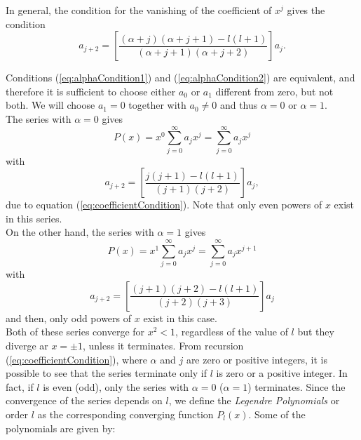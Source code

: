 In general, the condition for the vanishing of the coefficient of $x^j$ gives the condition
\begin{equation}
 a_{j+2}  =  \left[\frac{ (\alpha + j)(\alpha + j+1) - l(l+1) }{ (\alpha + j+1)(\alpha + j+2)  } \right] a_j.\label{eq:coefficientCondition}
 \end{equation} 
 
Conditions (\ref{eq:alphaCondition1}) and (\ref{eq:alphaCondition2}) are equivalent, and therefore it is sufficient to choose either $a_0$ or $a_1$ different from zero, but not both. We will choose $a_1=0$ together with $a_0 \neq 0$ and  thus $\alpha=0$ or $\alpha = 1$. \\

The series with $\alpha=0$ gives
\begin{equation}
 P (x) = x^0 \sum_{j=0}^\infty a_j x^j = \sum_{j=0}^\infty a_j x^j 
\end{equation}
with
\begin{equation}
 a_{j+2}  =  \left[\frac{ j( j+1) - l(l+1) }{ (j+1)( j+2)  } \right] a_j, \label{eq:evenCoeff}
\end{equation} 
due to equation (\ref{eq:coefficientCondition}). Note that only even powers of $x$ exist in this series.\\

On the other hand, the series with $\alpha=1$ gives
\begin{equation}
 P (x) = x^1 \sum_{j=0}^\infty a_j x^j = \sum_{j=0}^\infty a_j x^{j+1} 
\end{equation}
with 
\begin{equation}
 a_{j+2}  =  \left[\frac{ (j+1)( j+2) - l(l+1) }{ ( j+2)(j+3)  } \right] a_j \label{eq:oddCoeff}
 \end{equation} 
and then, only odd powers of $x$ exist in this case. \\

Both of these series converge for $x^2 <1$, regardless of the value of $l$ but they diverge ar $x=\pm1$, unless it terminates. From recursion (\ref{eq:coefficientCondition}), where $\alpha$ and $j$ are zero or positive integers, it is possible to see that the series terminate only if $l$ is zero or a positive integer. In fact, if $l$ is even (odd), only the series with $\alpha=0$ ($\alpha = 1$) terminates. Since the convergence of the series depends on $l$, we define the \textit{Legendre Polynomials} or order $l$ as the corresponding converging function $P_l (x)$.  Some of the polynomials are given by:\\

